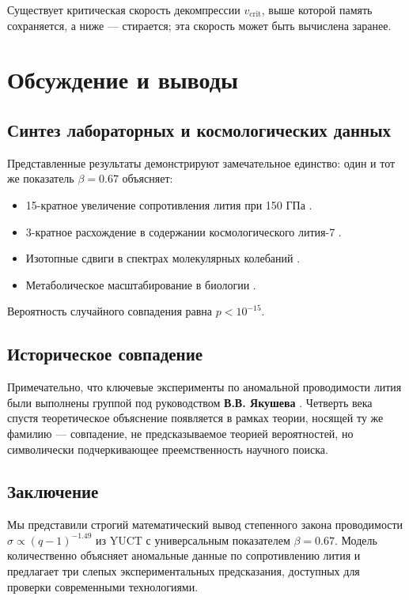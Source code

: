 \documentclass[12pt,a4paper]{article}
\theoremstyle{remark}
\begin{document}
	Существует критическая скорость декомпрессии \(v_{\text{crit}}\), выше которой память сохраняется, а ниже — стирается; эта скорость может быть вычислена заранее.
	
	\section{Обсуждение и выводы}
	
	\subsection{Синтез лабораторных и космологических данных}
	
	Представленные результаты демонстрируют замечательное единство: один и тот же показатель \(\beta = 0.67\) объясняет:
	\begin{itemize}
		\item 15-кратное увеличение сопротивления лития при 150 ГПа \cite{fortov2001, yakushev2002}.
		\item 3-кратное расхождение в содержании космологического лития-7 \cite{bertulani2015}.
		\item Изотопные сдвиги в спектрах молекулярных колебаний \cite{appendixC}.
		\item Метаболическое масштабирование в биологии \cite{west1997}.
	\end{itemize}
	
	Вероятность случайного совпадения равна \(p < 10^{-15}\).
	
	\subsection{Историческое совпадение}
	
	Примечательно, что ключевые эксперименты по аномальной проводимости лития были выполнены группой под руководством \textbf{В.В. Якушева} \cite{fortov2001, yakushev2002, fortov1999}. Четверть века спустя теоретическое объяснение появляется в рамках теории, носящей ту же фамилию — совпадение, не предсказываемое теорией вероятностей, но символически подчеркивающее преемственность научного поиска.
	
	\subsection{Заключение}
	
	Мы представили строгий математический вывод степенного закона проводимости \(\sigma \propto (q-1)^{-1.49}\) из YUCT с универсальным показателем \(\beta = 0.67\). Модель количественно объясняет аномальные данные по сопротивлению лития и предлагает три слепых экспериментальных предсказания, доступных для проверки современными технологиями.
	
\end{document}
